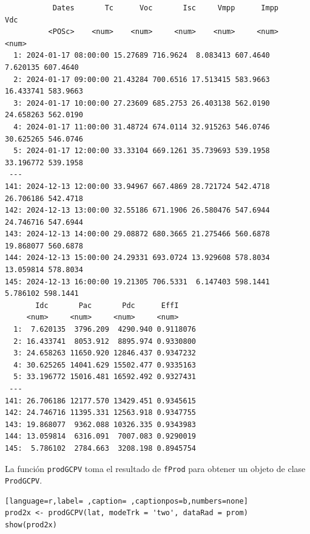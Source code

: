 \begin{itemize}
\begin{itemize}
\begin{verbatim}
		   Dates       Tc      Voc       Isc     Vmpp      Impp      Vdc
		  <POSc>    <num>    <num>     <num>    <num>     <num>    <num>
  1: 2024-01-17 08:00:00 15.27689 716.9624  8.083413 607.4640  7.620135 607.4640
  2: 2024-01-17 09:00:00 21.43284 700.6516 17.513415 583.9663 16.433741 583.9663
  3: 2024-01-17 10:00:00 27.23609 685.2753 26.403138 562.0190 24.658263 562.0190
  4: 2024-01-17 11:00:00 31.48724 674.0114 32.915263 546.0746 30.625265 546.0746
  5: 2024-01-17 12:00:00 33.33104 669.1261 35.739693 539.1958 33.196772 539.1958
 ---                                                                            
141: 2024-12-13 12:00:00 33.94967 667.4869 28.721724 542.4718 26.706186 542.4718
142: 2024-12-13 13:00:00 32.55186 671.1906 26.580476 547.6944 24.746716 547.6944
143: 2024-12-13 14:00:00 29.08872 680.3665 21.275466 560.6878 19.868077 560.6878
144: 2024-12-13 15:00:00 24.29331 693.0724 13.929608 578.8034 13.059814 578.8034
145: 2024-12-13 16:00:00 19.21305 706.5331  6.147403 598.1441  5.786102 598.1441
	   Idc       Pac       Pdc      EffI
	 <num>     <num>     <num>     <num>
  1:  7.620135  3796.209  4290.940 0.9118076
  2: 16.433741  8053.912  8895.974 0.9330800
  3: 24.658263 11650.920 12846.437 0.9347232
  4: 30.625265 14041.629 15502.477 0.9335163
  5: 33.196772 15016.481 16592.492 0.9327431
 ---                                        
141: 26.706186 12177.570 13429.451 0.9345615
142: 24.746716 11395.331 12563.918 0.9347755
143: 19.868077  9362.088 10326.335 0.9343983
144: 13.059814  6316.091  7007.083 0.9290019
145:  5.786102  2784.663  3208.198 0.8945754
\end{verbatim}
\end{itemize}
\end{itemize}

La función \texttt{prodGCPV} toma el resultado de \texttt{fProd} para obtener un objeto de clase \texttt{ProdGCPV}.
\begin{lstlisting}[language=r,label= ,caption= ,captionpos=b,numbers=none]
prod2x <- prodGCPV(lat, modeTrk = 'two', dataRad = prom)
show(prod2x)
\end{lstlisting}

